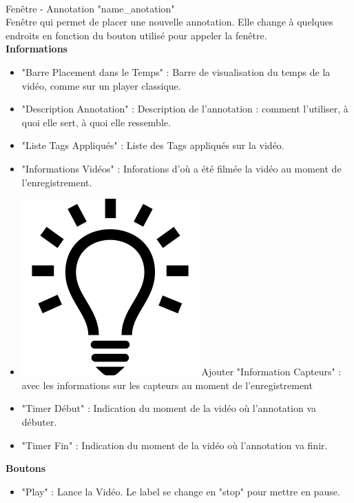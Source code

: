 \documentclass[11pt,french,a4paper]{report}
\begin{document}
\begin{multicols}{2}
\begin{small}
\dotfill \\
\Large Fenêtre - Annotation "name\_anotation"\normalsize \\
    Fenêtre qui permet de placer une nouvelle annotation. Elle change à quelques endroits en fonction
    du bouton utilisé pour appeler la fenêtre. \\
\large \textbf{Informations}\normalsize
    \begin{itemize}[label=, leftmargin=*,parsep=0cm,itemsep=0cm,topsep=0cm]
        \item "Barre Placement dans le Temps" : Barre de visualisation du temps de la vidéo, comme sur un player classique.
        \item "Description Annotation" : Description de l'annotation : comment l'utiliser, à quoi elle sert, à quoi elle ressemble.
        \item "Liste Tags Appliqués" : Liste des Tags appliqués sur la vidéo.
        \item "Informations Vidéos" : Inforations d'où a été filmée la vidéo au moment de l'enregistrement.
        \item \includegraphics[scale=0.05]{../images/logo/logo_ampoule} Ajouter "Information Capteurs" :
            avec les informations sur les capteurs au moment de l'enregistrement 
        \item "Timer Début" : Indication du moment de la vidéo où l'annotation va débuter.
        \item "Timer Fin" : Indication du moment de la vidéo où l'annotation va finir.
    \end{itemize}
\large \textbf{Boutons}\normalsize
    \begin{itemize}[label=, leftmargin=*,parsep=0cm,itemsep=0cm,topsep=0cm]
        \item "Play" : Lance la Vidéo. Le label se change en "stop" pour mettre en pause.

\end{itemize}
\end{small}
\end{multicols}
\end{document}
